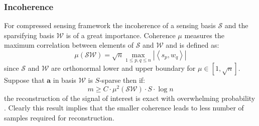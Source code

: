 \subsubsection{Incoherence}
For compressed sensing framework the incoherence of a sensing basis $\mathcal{S}$ and the sparsifying basis $\mathcal{W}$ is of a great importance. 
Coherence $\mu$ measures the maximum correlation between elements of $\mathcal{S}$ and $\mathcal{W}$ and is defined as:
\begin{equation}
	\mu (\mathcal{S}\mathcal{W}) = \sqrt{n} \max_{1\leq p, q\leq n}{\left|\left<{s_p , w_q}\right>\right|}
\end{equation}
since $\mathcal{S}$ and $\mathcal{W}$ are orthonormal lower and upper boundary for $\mu \in \left[1,\sqrt{n}\right]$. 
Suppose that $\mathbf{a}$ in basis $\mathcal{W}$ is $S$-sparse then if:
 \begin{equation}
 	m\geq C \cdot \mu^2(\mathcal{S}\mathcal{W}) \cdot S \cdot \log{n}
 \end{equation}
the reconstruction of the signal of interest is exact with overwhelming probability \cite{2007InvPr..23..969C}. 
Clearly this result implies that the smaller coherence leads to less number of samples required for reconstruction.
